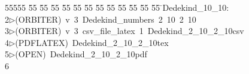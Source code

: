 %
%
\begin{tabbing}
55555 \= 55 \= 55 \= 55 \= 55 \= 55 \= 55 \= 55 \= 55 \= 55 \= 55 \= 55 \= 55 \= \>Dedekind\_10\_10:\\[0pt]
2\>$\triangleright$\>(ORBITER)\ v\ 3\ Dedekind\_numbers\ 2\ 10\ 2\ 10\\[0pt]
3\>$\triangleright$\>(ORBITER)\ v\ 3\ csv\_file\_latex\ 1\ Dedekind\_2\_10\_2\_10csv\\[0pt]
4\>$\triangleright$\>(PDFLATEX)\ Dedekind\_2\_10\_2\_10tex\\[0pt]
5\>$\triangleright$\>(OPEN)\ Dedekind\_2\_10\_2\_10pdf\\[0pt]
6\>\end{tabbing}
